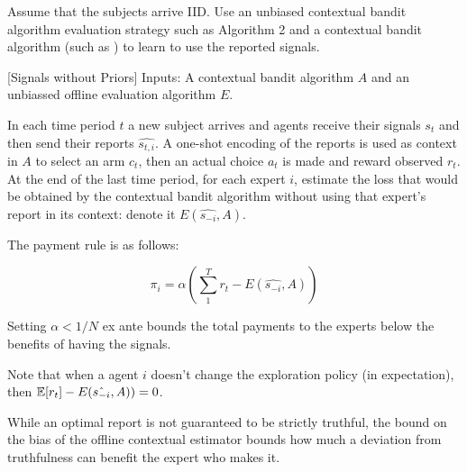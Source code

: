 


Assume that the subjects arrive IID. Use an unbiased contextual bandit algorithm evaluation strategy such as \cite{li2011unbiased}  Algorithm 2 and a contextual bandit algorithm (such as \cite{syrgkanis2016efficient}) to learn to use the reported signals. %

\begin{mech}\label{mech:bandit}[Signals without Priors]
Inputs: A contextual bandit algorithm $A$ and an unbiassed offline evaluation algorithm $E$.

In each time period $t$ a new subject arrives and agents receive their signals $s_t$ and then send their reports $\hat{s_{t,i}}$. A one-shot encoding of the reports is used as context in $A$ to select an arm $c_t$, then an actual choice $a_t$ is made and reward observed $r_t$.
At the end of the last time period, for each expert $i$, estimate the loss that would be obtained by the contextual bandit algorithm without using that expert's report in its context: denote it $E(\hat{s_{-i}},A)$.
 
The payment rule is as follows:

\[
    \pi_i =  \alpha (\sum_1^T r_t -  E(\hat{s_{-i}},A))
\]

Setting $\alpha<1/N$ ex ante bounds the total payments to the experts below the benefits of having the signals.

\end{mech}


Note that when a agent $i$ doesn't change the exploration policy (in expectation), then $ \operatorname*{\mathbb E}[r_t] -  E(\hat{s_{-i}},A)) =0  $.

While an optimal report is not guaranteed to be strictly truthful, the bound on the bias of the offline contextual estimator bounds how much a deviation from truthfulness can benefit the expert who makes it.



